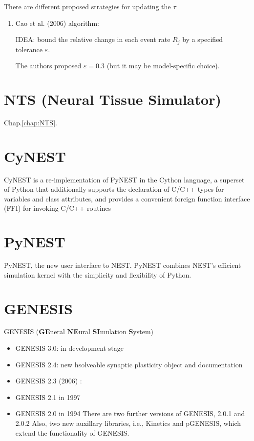 There are different proposed strategies for updating the $\tau$
\begin{enumerate}
  \item Cao et al. (2006)
  algorithm: 
  
  IDEA: bound the relative change in each event rate $R_j$ by a specified
  tolerance $\varepsilon$.
  
  The authors proposed $\varepsilon = 0.3$ (but it may be model-specific
  choice).
  
  
\end{enumerate}


\section{NTS (Neural Tissue Simulator)}

Chap.\ref{chap:NTS}.

\section{CyNEST}
\label{sec:CyNEST}

CyNEST is a re-implementation of PyNEST in the Cython language, a superset of
Python that additionally supports the declaration of C/C++ types for variables
and class attributes, and provides a convenient foreign function interface (FFI)
for invoking C/C++ routines


\section{PyNEST}
\label{sec:PyNEST}

 PyNEST, the new user interface to NEST. PyNEST combines NEST's efficient
simulation kernel with the simplicity and flexibility of Python.

\section{GENESIS}
\label{sec:GENESIS}

GENESIS ({\bf GE}neral {\bf NE}ural {\bf SI}mulation {\bf S}ystem)



\begin{itemize}
 \item GENESIS 3.0: in development stage

 \item GENESIS 2.4:  new hsolveable synaptic plasticity object and documentation
 
 \item GENESIS 2.3 (2006) : 
 
 
  \item GENESIS 2.1 in 1997

  \item GENESIS 2.0 in 1994 
  There are two further versions of GENESIS, 2.0.1 and 2.0.2 Also, two new
  auxillary libraries, i.e., Kinetics and pGENESIS, which extend the
  functionality of GENESIS.
  
  
\end{itemize}

